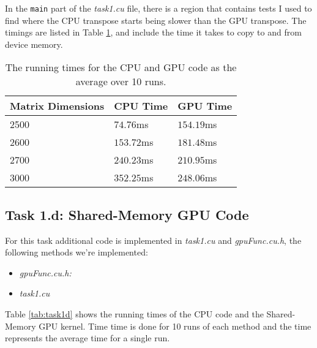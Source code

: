 In the \texttt{main} part of the \textit{task1.cu} file, there is a region that
contains tests I used to find where the CPU transpose starts being slower than
the GPU transpose. The timings are listed in Table \ref{tab:task1c}, and include
the time it takes to copy to and from device memory.

\begin{table}
    \begin{tabular}{|l|l|l|}
        \hline
        \textbf{Matrix Dimensions} & \textbf{CPU Time} & \textbf{GPU Time} \\\hline
        2500 &  $74.76$ms & $154.19$ms \\
        2600 & $153.72$ms & $181.48$ms \\
        2700 & $240.23$ms & $210.95$ms \\
        3000 & $352.25$ms & $248.06$ms \\\hline
    \end{tabular}
    \caption{The running times for the CPU and GPU code as the average over 10
    runs.}
    \label{tab:task1c}
\end{table}


\subsection{Task 1.d: Shared-Memory GPU Code}
For this task additional code is implemented in \textit{task1.cu} and
\textit{gpuFunc.cu.h}, the following methods we're implemented:
\begin{itemize}
    \item \textit{gpuFunc.cu.h:}

    \item \textit{task1.cu}
\end{itemize}

Table \ref{tab:task1d} shows the running times of the CPU code and the
Shared-Memory GPU kernel. Time time is done for 10 runs of each method and the
time represents the average time for a single run.

